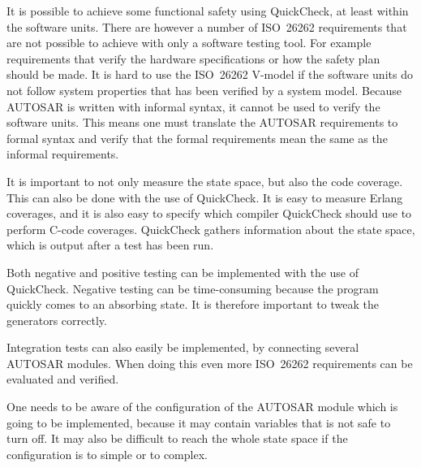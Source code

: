 It is possible to achieve some functional safety using QuickCheck, at
least within the software units. There are however a number of
ISO~26262 requirements that are not possible to achieve with only a
software testing tool. For example requirements that verify the
hardware specifications or how the safety plan should be made. It is
hard to use the ISO~26262 V-model if the software units do
not follow system properties that has been verified by a system
model. Because AUTOSAR is written with informal syntax, it cannot be
used to verify the software units. This means one must translate the
AUTOSAR requirements to formal syntax and verify that the formal
requirements mean the same as the informal requirements.

It is important to not only measure the state space, but also the code
coverage. This can also be done with the use of QuickCheck. It is easy
to measure Erlang coverages, and it is also easy to specify which
compiler QuickCheck should use to perform C-code coverages.
QuickCheck gathers information about the state space, which is
output after a test has been run.

Both negative and positive testing can be implemented with the use of
QuickCheck. Negative testing can be time-consuming because the program
quickly comes to an absorbing state. It is therefore important to tweak
the generators correctly.

Integration tests can also easily be implemented, by connecting
several AUTOSAR modules. When doing this even more ISO~26262
requirements can be evaluated and verified.

One needs to be aware of the configuration of the AUTOSAR module which
is going to be implemented, because it may contain variables that is
not safe to turn off. It may also be difficult to reach the whole
state space if the configuration is to simple or to complex.